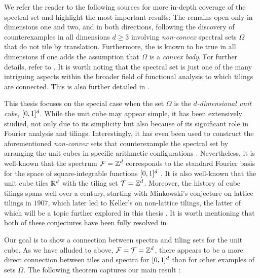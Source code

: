\documentclass[../thesis.tex]{subfiles}
\begin{document}
We refer the reader to the following sources for more in-depth coverage of the spectral set  and highlight the most important results: The  remains open only in dimensions one and two, and in both directions, following the discovery of counterexamples in all dimensions $d \geq 3$ involving \emph{non-convex} spectral sets $\Omega$ that do not tile by translation. Furthermore, the  is known to be true in all dimensions if one adds the assumption that $\Omega$ is a \emph{convex body}. For further details, refer to \cite{levFugledeConjectureConvex2022,dutkayReductionsSpectralSet2014,liDualityPropertiesSpectra2010,farkasFugledeConjectureExistence2006,kolountzakisStudyTranslationalTiling2003,jorgensenSpectralPairsCartesian2001}. It is worth noting that the spectral set  is just one of the many intriguing aspects within the broader field of functional analysis to which tilings are connected. This is also further detailed in \cite{kolountzakisStudyTranslationalTiling2003}. 

This thesis focuses on the special case when the set $\Omega$ is the \emph{$d$-dimensional unit cube}, $[0,1]^d$. While the unit cube may appear simple, it has been extensively studied, not only due to its simplicity but also because of its significant role in Fourier analysis and tilings. Interestingly, it has even been used to construct the aforementioned \emph{non-convex} sets that counterexample the spectral set  by arranging the unit cubes in specific arithmetic configurations \cite{levFugledeConjectureConvex2022}. Nevertheless, it is well-known that the spectrum $\mathcal{F}=\mathbb{Z}^d$ corresponds to the standard Fourier basis for the space of square-integrable functions  $[0,1]^d$ \cite{lagariasOrthonormalBasesExponentials2000}. It is also well-known that the unit cube tiles $\mathbb{R}^d$ with the tiling set $\mathcal{T}=\mathbb{Z}^d$. Moreover, the history of cube tilings spans well over a century, starting with Minkowski's conjecture on lattice tilings in $1907$, which later led to Keller's  on non-lattice tilings, the latter of which will be a topic further explored in this thesis \cite{liDualityPropertiesSpectra2010,iosevichSpectralTilingProperties1998}. It is worth mentioning that both of these conjectures have been fully resolved in 

Our goal is to show a connection between spectra and tiling sets for the unit cube. As we have alluded to above, $\mathcal{F}=\mathcal{T}=\mathbb{Z}^d$, there appears to be a more direct connection between tiles and spectra for $[0,1]^d$ than for other examples of sets $\Omega$. The following theorem captures our main result \cite{iosevichSpectralTilingProperties1998}:
\end{document}
